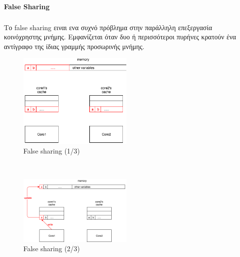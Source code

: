 \documentclass[12pt]{article}
\newcommand{\en}[1]{\foreignlanguage{english}{#1}}
\begin{document}
\paragraph{\en{False Sharing}}
\subparagraph{}
Το \en{false sharing} ειναι ενα συχνό πρόβλημα στην παράλληλη επεξεργασία κοινόχρηστης μνήμης. Εμφανίζεται όταν δυο ή περισσότεροι πυρήνες κρατούν ένα αντίγραφο της ίδιας γραμμής προσωρινής μνήμης. 

\begin{figure}[h]
\includegraphics[width=0.5\textwidth]{false_sharing_2}
\centering
\captionsetup{justification=centering, singlelinecheck=false}
	\caption{\en{False sharing (1/3)}}
\label{fig:false_sharing_2}
\end{figure}

\ \\
\begin{figure}
	\centering
	\includegraphics[width=0.5\textwidth]{false_sharing_3}
	\captionsetup{justification=centering, singlelinecheck=false}
	\caption{\en{False sharing (2/3)}}
\label{fig:false_sharing_3}
\end{figure}
\end{document}
